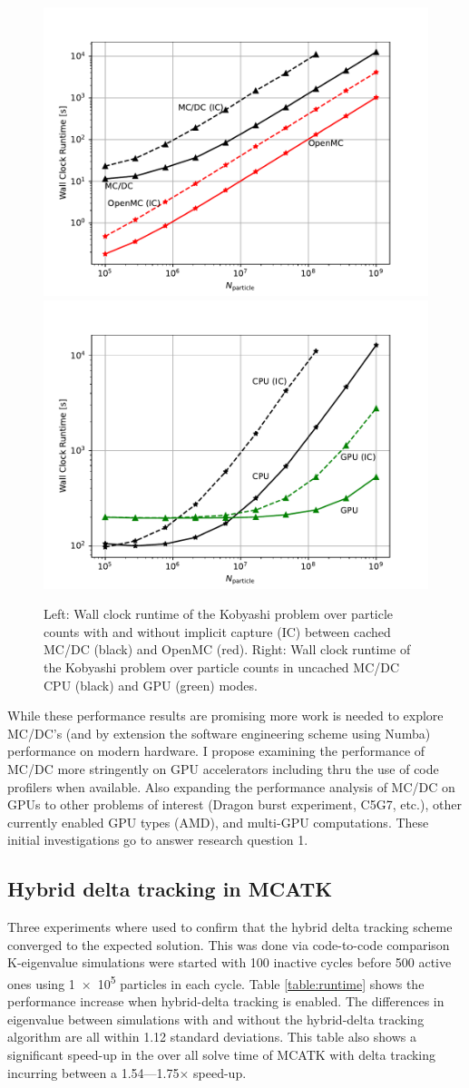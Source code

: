 \begin{figure}[h]
    \centering
    \includegraphics[width=.49\textwidth]{figures/results/code_comparisons.pdf}
    \includegraphics[width=.49\textwidth]{figures/results/mcdc_comparisons.pdf}
    \caption{Left: Wall clock runtime of the Kobyashi problem over particle counts with and without implicit capture (IC) between cached MC/DC (black) and OpenMC (red). 
    Right: Wall clock runtime of the Kobyashi problem over particle counts in uncached MC/DC CPU (black) and GPU (green) modes.}
    \label{performance_results}
\end{figure}

While these performance results are promising more work is needed to explore MC/DC's (and by extension the software engineering scheme using Numba) performance on modern hardware.
I propose examining the performance of MC/DC more stringently on GPU accelerators including thru the use of code profilers when available.
Also expanding the performance analysis of MC/DC on GPUs to other problems of interest (Dragon burst experiment, C5G7, etc.), other currently enabled GPU types (AMD), and multi-GPU computations.
These initial investigations go to answer research question 1.

\subsection{Hybrid delta tracking in MCATK}

Three experiments where used to confirm that the hybrid delta tracking scheme converged to the expected solution. This was done  via code-to-code comparison
K-eigenvalue simulations were started with 100 inactive cycles before 500 active ones using \num{1e5} particles in each cycle.
Table \ref{table:runtime} shows the performance increase when hybrid-delta tracking is enabled.
The differences in eigenvalue between simulations with and without the hybrid-delta tracking algorithm are all within 1.12 standard deviations. This table also shows a significant speed-up in the over all solve time of MCATK with delta tracking incurring between a 1.54---1.75$\times$ speed-up.

